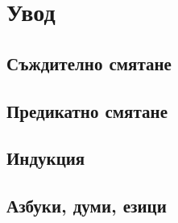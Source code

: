 \chapter{Увод}

\section{Съждително смятане}

\section{Предикатно смятане}

\section{Индукция}

\section{Азбуки, думи, езици}
